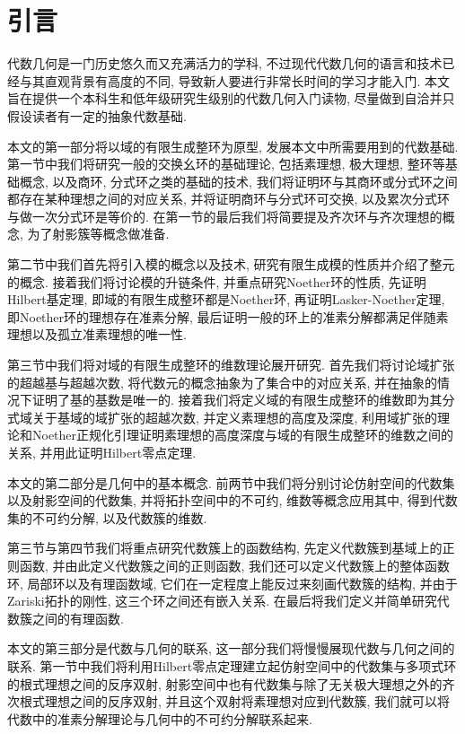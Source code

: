 
\section{引言}

代数几何是一门历史悠久而又充满活力的学科, 不过现代代数几何的语言和技术已经与其直观背景有高度的不同, 导致新人要进行非常长时间的学习才能入门. 本文旨在提供一个本科生和低年级研究生级别的代数几何入门读物, 尽量做到自洽并只假设读者有一定的抽象代数基础.

本文的第一部分将以域的有限生成整环为原型, 发展本文中所需要用到的代数基础. 第一节中我们将研究一般的交换幺环的基础理论, 包括素理想, 极大理想, 整环等基础概念, 以及商环, 分式环之类的基础的技术, 我们将证明环与其商环或分式环之间都存在某种理想之间的对应关系, 并将证明商环与分式环可交换, 以及累次分式环与做一次分式环是等价的. 在第一节的最后我们将简要提及齐次环与齐次理想的概念, 为了射影簇等概念做准备.

第二节中我们首先将引入模的概念以及技术, 研究有限生成模的性质并介绍了整元的概念. 接着我们将讨论模的升链条件, 并重点研究Noether环的性质, 先证明Hilbert基定理, 即域的有限生成整环都是Noether环, 再证明Lasker-Noether定理, 即Noether环的理想存在准素分解, 最后证明一般的环上的准素分解都满足伴随素理想以及孤立准素理想的唯一性.

第三节中我们将对域的有限生成整环的维数理论展开研究. 首先我们将讨论域扩张的超越基与超越次数, 将代数元的概念抽象为了集合中的对应关系, 并在抽象的情况下证明了基的基数是唯一的. 接着我们将定义域的有限生成整环的维数即为其分式域关于基域的域扩张的超越次数, 并定义素理想的高度及深度, 利用域扩张的理论和Noether正规化引理证明素理想的高度深度与域的有限生成整环的维数之间的关系, 并用此证明Hilbert零点定理.

\bigskip

本文的第二部分是几何中的基本概念. 前两节中我们将分别讨论仿射空间的代数集以及射影空间的代数集, 并将拓扑空间中的不可约, 维数等概念应用其中, 得到代数集的不可约分解, 以及代数簇的维数.

第三节与第四节我们将重点研究代数簇上的函数结构, 先定义代数簇到基域上的正则函数, 并由此定义代数簇之间的正则函数, 我们还可以定义代数簇上的整体函数环, 局部环以及有理函数域, 它们在一定程度上能反过来刻画代数簇的结构, 并由于Zariski拓扑的刚性, 这三个环之间还有嵌入关系. 在最后将我们定义并简单研究代数簇之间的有理函数.

\bigskip

本文的第三部分是代数与几何的联系, 这一部分我们将慢慢展现代数与几何之间的联系. 第一节中我们将利用Hilbert零点定理建立起仿射空间中的代数集与多项式环的根式理想之间的反序双射, 射影空间中也有代数集与除了无关极大理想之外的齐次根式理想之间的反序双射, 并且这个双射将素理想对应到代数簇, 我们就可以将代数中的准素分解理论与几何中的不可约分解联系起来.

